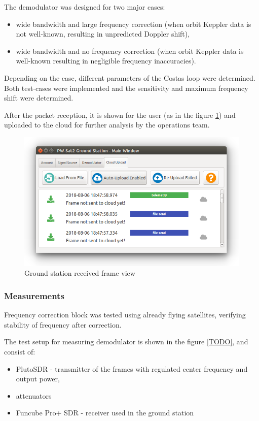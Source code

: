 The demodulator was designed for two major cases:
\begin{itemize}
    \item wide bandwidth and large frequency correction (when orbit Keppler data is not well-known, resulting in unpredicted Doppler shift),
    \item wide bandwidth and no frequency correction (when orbit Keppler data is well-known resulting in negligible frequency inaccuracies).
\end{itemize}

Depending on the case, different parameters of the Costas loop were determined. Both test-cases were implemented and the sensitivity and maximum frequency shift were determined.

After the packet reception, it is shown for the user (as in the figure \ref{gs_frame_view}) and uploaded to the cloud for further analysis by the operations team.

\begin{figure}
    \centering
    \includegraphics[width=0.6\paperwidth]{img/5/gs_frame_view.png}
    \caption{Ground station received frame view}
    \label{gs_frame_view}
\end{figure}


\subsubsection{Measurements}
Frequency correction block was tested using already flying satellites, verifying stability of frequency after correction.

The test setup for measuring demodulator is shown in the figure \ref{TODO}, and consist of:
\begin{itemize}
    \item PlutoSDR - transmitter of the frames with regulated center frequency and output power,
    \item attenuators
    \item Funcube Pro+ SDR - receiver used in the ground station
\end{itemize}

